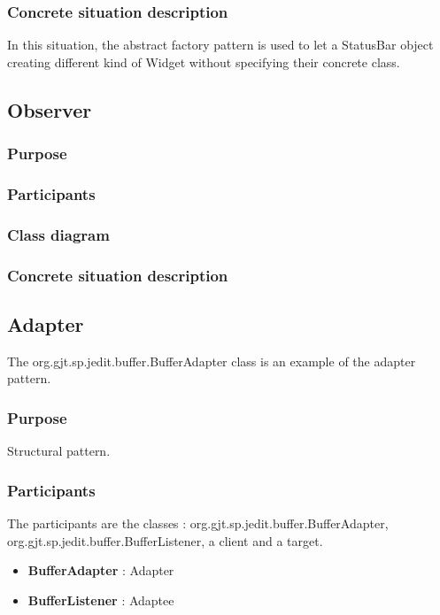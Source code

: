 \documentclass[a4paper,10pt]{article}
\begin{document}
\subsubsection{Concrete situation description}
In this situation, the abstract factory pattern is used to let a StatusBar object creating different kind of Widget without specifying their concrete class. 

\subsection{Observer}

\subsubsection{Purpose}

\subsubsection{Participants}

\subsubsection{Class diagram}

\subsubsection{Concrete situation description}


\subsection{Adapter}
The org.gjt.sp.jedit.buffer.BufferAdapter class is an example of the adapter pattern.

\subsubsection{Purpose}
Structural pattern.
\subsubsection{Participants}
The participants are the classes : org.gjt.sp.jedit.buffer.BufferAdapter, org.gjt.sp.jedit.buffer.BufferListener, a client and a target.
\begin{itemize}
 \item \textbf{BufferAdapter} : Adapter
 \item \textbf{BufferListener} : Adaptee
\end{itemize}
\end{document}
